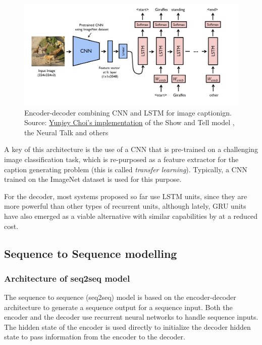 \begin{figure}[hpt]
	\centering
	\includegraphics[scale=0.3]{images/ch3/cnn-rnn.png}
	\caption{Encoder-decoder combining CNN and LSTM for image captionign. Source:  \href{https://github.com/yunjey/pytorch-tutorial/tree/master/tutorials/03-advanced/image_captioning}{Yunjey Choi's implementation} of the Show and Tell model \citep{Vinyals2015}, the Neural Talk and others}
	\label{fig:cnn-rnn-enco-deco}
\end{figure}

A key of this architecture is the use of a CNN that is pre-trained on a challenging image classification task, which is re-purposed as a feature extractor for the caption generating problem (this is called \textit{transfer learning}). Typically, a CNN trained on the ImageNet dataset is used for this purpose.

For the decoder, most systems proposed so far use LSTM units, since they are more powerful than other types of recurrent units, although lately, GRU units have also emerged as a viable alternative with similar capabilities by at a reduced cost.

\subsection{Sequence to Sequence modelling}\label{subsec:seq2seq}

\subsubsection{Architecture of seq2seq model}

The sequence to sequence (seq2seq) model is based on the encoder-decoder architecture to generate a sequence output for a sequence input. Both the encoder and the decoder use recurrent neural networks to handle sequence inputs. The hidden state of the encoder is used directly to initialize the decoder hidden state to pass information from the encoder to the decoder.

